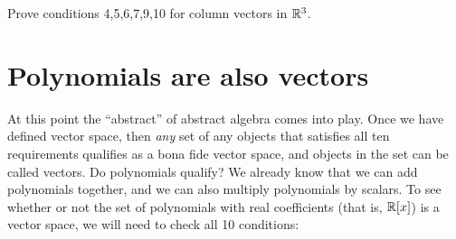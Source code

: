 %
%

\begin{exercise}{}
Prove conditions 4,5,6,7,9,10 for column vectors in $\mathbb{R}^3$.
\end{exercise}
\section{Polynomials are also  vectors}\label{sec:polyAreVec}

At this point the ``abstract''  of abstract algebra comes into play. Once we have defined vector space, then \emph{any} set of any objects that satisfies all ten requirements qualifies as a bona fide vector space, and objects in the set can be called vectors. Do polynomials qualify? We already know that we can add polynomials together, and we can also multiply polynomials by  scalars. To see whether or not the set of polynomials with real coefficients (that is, $\mathbb{R}[x]$) is a vector space, we will need to check all 10 conditions: 
\medskip{}

